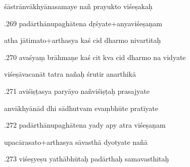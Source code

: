 \documentclass[article,12pt,a4paper]{memoir}%
\newcounter{parCount}
\begin{document}
	  
	  \pstart \leavevmode%
	śāstrānvākhyānasamaye nañ prayukto viśeṣakaḥ 
	{}
	\pend%
      

	  
	  \pstart {}.269 padārthānupaghātena dṛśyate+anyaviśeṣaṇam 
	{}
	\pend%
      

	  
	  \pstart \leavevmode%
	atha jātimato+arthasya kaś cid dharmo nivartitaḥ 
	{}
	\pend%
      

	  
	  \pstart {}.270 avaśyaṃ brāhmaṇe kaś cit kva cid dharmo na vidyate 
	{}
	\pend%
      

	  
	  \pstart \leavevmode%
	viśeṣāvacanāt tatra nañaḥ śrutir anarthikā 
	{}
	\pend%
      

	  
	  \pstart {}.271 aviśiṣṭasya paryāyo nañviśiṣṭaḥ prasajyate 
	{}
	\pend%
      

	  
	  \pstart \leavevmode%
	anvākhyānād dhi sādhutvam evaṃbhūte pratīyate 
	{}
	\pend%
      

	  
	  \pstart {}.272 padārthānupaghātena yady apy atra viśeṣaṇam 
	{}
	\pend%
      

	  
	  \pstart \leavevmode%
	upacārasato+arthasya sāvasthā dyotyate nañā 
	{}
	\pend%
      

	  
	  \pstart {}.273 viśeṣyeṣu yathābhūtaḥ padārthaḥ samavasthitaḥ 
	{}
	\pend%
      
\end{document}
